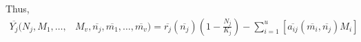 \documentclass{amsart}
\theoremstyle{definition}
\theoremstyle{remark}
\numberwithin{equation}{section}
\begin{document}
Thus,
\begin{align*}
	\overline{Y_j}(N_j, M_1, \dots, &M_v, \overline{n_j}, \overline{m_1}, \dots, \overline{m_v}) = \overline{r_j}(\overline{n_j})\left(1 - \frac{N_j}{K_j}\right) - \sum\limits_{i = 1}^{u}\left[\overline{a_{ij}}(\overline{m_i}, \overline{n_j})M_i\right]
\end{align*}


































\pagebreak
\end{document}
